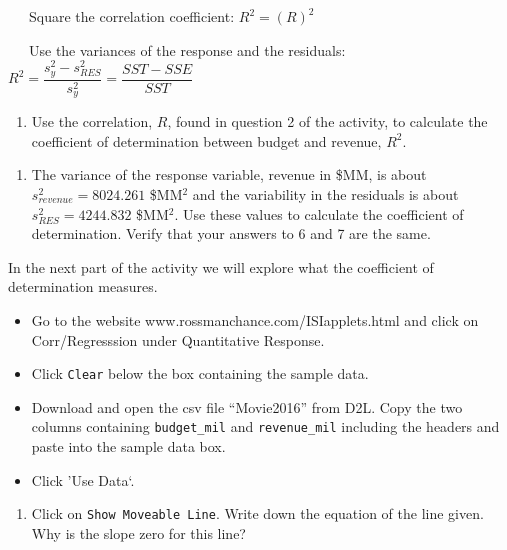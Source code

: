 \documentclass[
]{report}
\providecommand{\tightlist}{%
  \setlength{\itemsep}{0pt}\setlength{\parskip}{0pt}}
\begin{document}
~~~Square the correlation coefficient: \(R^2 = (R)^2\)

~~~Use the variances of the response and the residuals: \(R^2 = \dfrac{s_y^2 - s_{RES}^2}{s_y^2} = \dfrac{SST - SSE}{SST}\)

\begin{enumerate}
\def\labelenumi{\arabic{enumi}.}
\setcounter{enumi}{5}
\tightlist
\item
  Use the correlation, \(R\), found in question 2 of the activity, to calculate the coefficient of determination between budget and revenue, \(R^2\).
\end{enumerate}

\vspace{.4in}

\begin{enumerate}
\def\labelenumi{\arabic{enumi}.}
\setcounter{enumi}{6}
\tightlist
\item
  The variance of the response variable, revenue in \$MM, is about \(s_{revenue}^2 = 8024.261\) \$MM\(^2\) and the variability in the residuals is about \(s_{RES}^2 = 4244.832\) \$MM\(^2\). Use these values to calculate the coefficient of determination. Verify that your answers to 6 and 7 are the same.
\end{enumerate}

\vspace{1in}

In the next part of the activity we will explore what the coefficient of determination measures.

\begin{itemize}
\item
  Go to the website www.rossmanchance.com/ISIapplets.html and click on Corr/Regresssion under Quantitative Response.
\item
  Click \texttt{Clear} below the box containing the sample data.
\item
  Download and open the csv file ``Movie2016'' from D2L. Copy the two columns containing \texttt{budget\_mil} and \texttt{revenue\_mil} including the headers and paste into the sample data box.
\item
  Click 'Use Data`.
\end{itemize}

\begin{enumerate}
\def\labelenumi{\arabic{enumi}.}
\setcounter{enumi}{7}
\tightlist
\item
  Click on \texttt{Show\ Moveable\ Line}. Write down the equation of the line given. Why is the slope zero for this line?
\end{enumerate}
\end{document}

